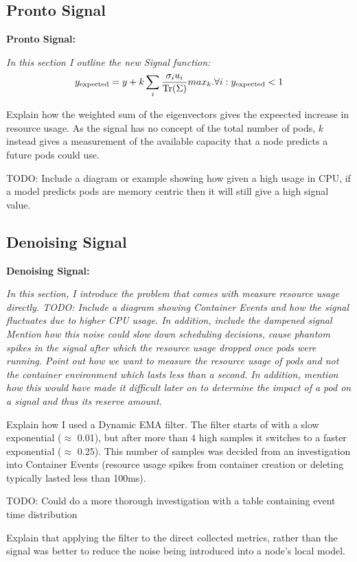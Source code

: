 \subsection{Pronto Signal}
\begin{tcolorbox}[boxsep=0mm,left=2.5mm,right=2.5mm]
    \textbf{Pronto Signal:} {\em In this section I outline the new Signal
    function:
    \[ y_{\text{expected}} = y + k \sum_i \frac{\sigma_i u_i}{\text{Tr}(\Sigma)} \\
        max_k. \forall i: y_{\text{expected}} < 1 \]

    Explain how the weighted sum of the eigenvectors gives the expeected
    increase in resource usage. As the signal has no concept of the total number
    of pods, $k$ instead gives a measurement of the available capacity that a
    node predicts a future pods could use.

    TODO: Include a diagram or example showing how given a high usage in CPU, if
    a model predicts pods are memory centric then it will still give a high
    signal value.
    }
\end{tcolorbox}

\subsection{Denoising Signal}
\begin{tcolorbox}[boxsep=0mm,left=2.5mm,right=2.5mm]
    \textbf{Denoising Signal:} {\em In this section, I introduce the problem
    that comes with measure resource usage directly.
    TODO: Include a diagram showing Container Events and how the signal
    fluctuates due to higher CPU usage. In addition, include the dampened signal
    Mention how this noise could slow down scheduling decisions, cause phantom
    spikes in the signal after which the resource usage dropped once pods were
    running. Point out how we want to measure the resource usage of pods and not
    the container environment which lasts less than a second. In addition,
    mention how this would have made it difficult later on to determine the
    impact of a pod on a signal and thus its reserve amount.

    Explain how I used a Dynamic EMA filter. The filter starts of with a slow
    exponential ($\approx$ 0.01), but after more than 4 high samples it switches
    to a faster exponential ($\approx$ 0.25). This number of samples was decided
    from an investigation into Container Events (resource usage spikes from
    container creation or deleting typically lasted less than 100ms).

    TODO: Could do a more thorough investigation with a table containing event
    time distribution

    Explain that applying the filter to the direct collected metrics, rather
    than the signal was better to reduce the noise being introduced into a
    node's local model.
    }
\end{tcolorbox}

